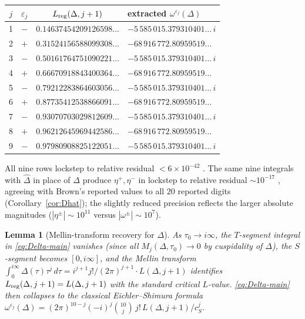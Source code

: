\documentclass[11pt,letterpaper]{article}
\newtheorem{lemma}[theorem]{Lemma}
\newcommand{\Dhat}{\widehat{\Delta}}
\newcommand{\eps}{\varepsilon}
\begin{document}
\begin{center}
\begin{tabular}{cccl}
\toprule
$j$ & $\eps_j$ & $L_{\rm reg}(\Delta, j+1)$ & extracted $\omega^{\eps_j}(\Delta)$ \\
\midrule
1  & $-$ & $0.14637454209126598\ldots$  & $-5\,585\,015.379310401\ldots\,i$ \\
2  & $+$ & $0.31524156588099308\ldots$  & $-68\,916\,772.80959519\ldots$ \\
3  & $-$ & $0.50161764751090221\ldots$  & $-5\,585\,015.379310401\ldots\,i$ \\
4  & $+$ & $0.66670918843400364\ldots$  & $-68\,916\,772.80959519\ldots$ \\
5  & $-$ & $0.79212283864603056\ldots$  & $-5\,585\,015.379310401\ldots\,i$ \\
6  & $+$ & $0.87735412538866091\ldots$  & $-68\,916\,772.80959519\ldots$ \\
7  & $-$ & $0.93070703029812609\ldots$  & $-5\,585\,015.379310401\ldots\,i$ \\
8  & $+$ & $0.96212645969442586\ldots$  & $-68\,916\,772.80959519\ldots$ \\
9  & $-$ & $0.97980908825122051\ldots$  & $-5\,585\,015.379310401\ldots\,i$ \\
\bottomrule
\end{tabular}
\end{center}

All nine rows lockstep to relative residual $< 6\times 10^{-42}$
\cite{VerifyL}.  The same nine integrals with $\Dhat$ in place of
$\Delta$ produce $\eta^+, \eta^-$ in lockstep to relative residual
$\sim 10^{-17}$ \cite{NumericScript}, agreeing with Brown's reported
values to all $20$ reported digits (Corollary~\ref{cor:Dhat}); the
slightly reduced precision reflects the larger absolute magnitudes
($|\eta^\pm| \sim 10^{11}$ versus $|\omega^\pm| \sim 10^7$).

\begin{lemma}[Mellin-transform recovery for $\Delta$]\label{lem:Mellin-recovery}
As $\tau_0 \to i\infty$, the $T$-segment integral in \eqref{eq:Delta-main}
vanishes (since all $M_j(\Delta, \tau_0) \to 0$ by cuspidality of
$\Delta$), the $S$-segment becomes $[0, i\infty]$, and the Mellin transform
$\int_0^{i\infty}\!\Delta(\tau)\tau^j\,d\tau = i^{j+1}j!/(2\pi)^{j+1}\cdot L(\Delta, j+1)$
identifies $L_{\rm reg}(\Delta, j+1) = L(\Delta, j+1)$ with the standard
critical $L$-value.  \eqref{eq:Delta-main} then collapses to the
classical Eichler--Shimura formula
$\omega^{\eps_j}(\Delta) = (2\pi)^{10-j}(-i)^j\binom{10}{j}\,j!\,L(\Delta, j+1)/c_S^j$.
\end{lemma}
\end{document}
